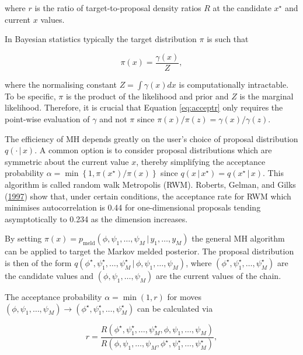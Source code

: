 \documentclass[11pt,]{book}
\begin{document}
where \(r\) is the ratio of target-to-proposal density ratios \(R\) at
the candidate \(x^\star\) and current \(x\) values.

In Bayesian statistics typically the target distribution \(\pi\) is such
that

\begin{equation}
\pi(x) = \frac{\gamma(x)}{Z}, \label{eq:normconst}
\end{equation}

where the normalising constant \(Z = \int \gamma(x) dx\) is
computationally intractable. To be specific, \(\pi\) is the product of
the likelihood and prior and \(Z\) is the marginal likelihood.
Therefore, it is crucial that Equation \eqref{eq:acceptr} only requires
the point-wise evaluation of \(\gamma\) and not \(\pi\) since
\(\pi(x)/\pi(z) = \gamma(x)/\gamma(z)\).

The efficiency of MH depends greatly on the user's choice of proposal
distribution \(q(\cdot \, | \, x)\). A common option is to consider
proposal distributions which are symmetric about the current value
\(x\), thereby simplifying the acceptance probability
\(\alpha = \min \left\{1, \pi(x^\star)/\pi(x)\right\}\) since
\(q(x \, | \, x^\star) = q(x^\star \, | \, x)\). This algorithm is
called random walk Metropolis (RWM). Roberts, Gelman, and Gilks
(\protect\hyperlink{ref-roberts1997weak}{1997}) show that, under certain
conditions, the acceptance rate for RWM which minimises autocorrelation
is 0.44 for one-dimensional proposals tending asymptotically to 0.234 as
the dimension increases.

By setting
\(\pi(x) = p_{\text{meld}}(\phi, \psi_1, \ldots, \psi_M \, | \, y_1, \ldots, y_M)\)
the general MH algorithm can be applied to target the Markov melded
posterior. The proposal distribution is then of the form
\(q(\phi^\star, \psi_1^\star, \ldots, \psi_M^\star \, | \, \phi, \psi_1, \ldots, \psi_M)\),
where \((\phi^\star, \psi_1^\star, \ldots, \psi_M^\star)\) are the
candidate values and \((\phi, \psi_1, \ldots, \psi_M)\) are the current
values of the chain.

The acceptance probability \(\alpha = \min (1, r)\) for moves
\((\phi, \psi_1, \ldots, \psi_M) \to (\phi^\star, \psi_1^\star, \ldots, \psi_M^\star)\)
can be calculated via

\begin{equation}
r=\frac{R(\phi^\star, \psi_1^\star, \ldots, \psi_M^\star, \phi, \psi_1, \ldots, \psi_M)}
       {R(\phi, \psi_1, \ldots, \psi_M, \phi^\star, \psi_1^\star, \ldots, \psi_M^\star)}, \label{eq:acceptprob}
\end{equation}
\end{document}
